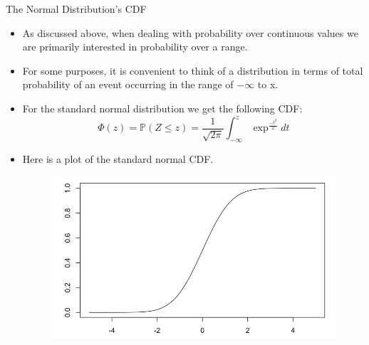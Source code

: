 \documentclass[handout]{beamer}
\begin{document}
\begin{frame}{The Normal Distribution’s CDF}

\scriptsize{
\begin{itemize}
 \item As discussed above, when dealing with probability over continuous values we are primarily interested in probability over a range.
 \item For some purposes, it is convenient to think of a distribution in terms of total probability of an event occurring in the range of $-\infty$ to x.
 \item  For the standard normal distribution we get the following CDF:
 \begin{displaymath}
  \Phi(z)= \mathbb{P}(Z \leq z) = \frac{1}{\sqrt{2\pi}}\int_{-\infty}^{z} \exp^{\frac{-t^2}{2}}dt 
 \end{displaymath}
\item Here is a plot of the standard normal CDF.

   \begin{figure}[h!]
	\centering
	\includegraphics[scale=0.25]{pics/normalcdf.png}
\end{figure}

 
 \end{itemize}

}
\end{frame}
\end{document}
